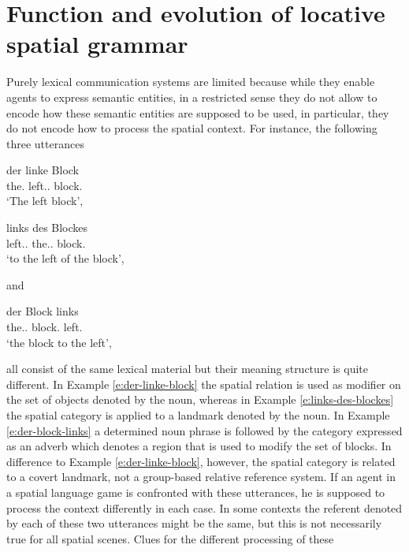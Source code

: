 %

\chapter{Function and evolution of locative spatial grammar}
\label{s:grammar}
Purely lexical communication systems are limited
because while they enable agents to express semantic entities, in a restricted sense 
they do not allow to encode how these semantic entities are supposed to be used,
in particular, they do not encode how to process the spatial context.
For instance, the following three utterances 

\begin{exe}
\ex\label{e:der-linke-block}
\gll der linke Block\\
{the.\NOM} {left.\ADJ.\NOM} block.\NOM\\
\glt `The left block',
\end{exe}
\begin{exe}
\ex\label{e:links-des-blockes}
\gll links des Blockes\\
{left.\PREP.\GEN} {the.\DET.\GEN} block.\GEN \\
\glt `to the left of the block',
\end{exe}
and
\begin{exe}
\ex\label{e:der-block-links}
\gll der Block links\\
{the.\DET.\NOM} {block.\NOM} left.\ADV\\
\glt `the block to the left',
\end{exe}
all consist of the same lexical material but their meaning structure is quite different.
In Example \ref{e:der-linke-block} the spatial relation is used as modifier on the set of
objects denoted by the noun, whereas in Example \ref{e:links-des-blockes} the
spatial category is applied to a landmark denoted by the noun. In Example \ref{e:der-block-links}
a determined noun phrase is followed by the category expressed as an adverb which
denotes a region that is used to modify the set of blocks. In difference to Example \ref{e:der-linke-block}, 
however, the spatial category is related to a covert landmark, not a 
group-based relative reference system.
If an agent in a spatial language game is confronted with these utterances, he is supposed to 
process the context differently in each case. In some contexts the referent
denoted by each of these two utterances might be the same, but this is not necessarily
true for all spatial scenes. Clues for the different processing of these
